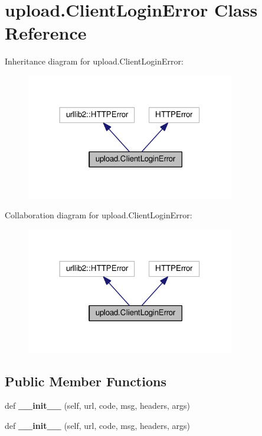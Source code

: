 \hypertarget{classupload_1_1ClientLoginError}{}\section{upload.\+Client\+Login\+Error Class Reference}
\label{classupload_1_1ClientLoginError}


Inheritance diagram for upload.\+Client\+Login\+Error\+:\nopagebreak
\begin{figure}[H]
\begin{center}
\leavevmode
\includegraphics[width=258pt]{classupload_1_1ClientLoginError__inherit__graph}
\end{center}
\end{figure}


Collaboration diagram for upload.\+Client\+Login\+Error\+:\nopagebreak
\begin{figure}[H]
\begin{center}
\leavevmode
\includegraphics[width=258pt]{classupload_1_1ClientLoginError__coll__graph}
\end{center}
\end{figure}
\subsection*{Public Member Functions}
\begin{DoxyCompactItemize}
\item 
def {\bfseries \+\_\+\+\_\+init\+\_\+\+\_\+} (self, url, code, msg, headers, args)\hypertarget{classupload_1_1ClientLoginError_a1e590616c2976d881e155958cedbbe47}{}\label{classupload_1_1ClientLoginError_a1e590616c2976d881e155958cedbbe47}

\item 
def {\bfseries \+\_\+\+\_\+init\+\_\+\+\_\+} (self, url, code, msg, headers, args)\hypertarget{classupload_1_1ClientLoginError_a1e590616c2976d881e155958cedbbe47}{}\label{classupload_1_1ClientLoginError_a1e590616c2976d881e155958cedbbe47}

\end{DoxyCompactItemize}
